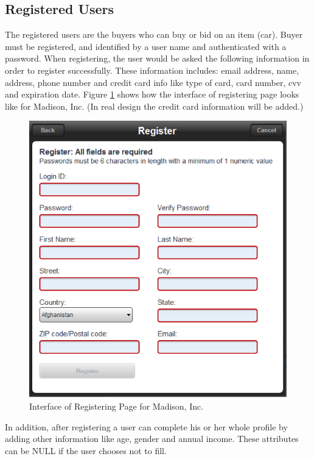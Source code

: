\documentclass[12pt]{article}
\begin{document}
\subsection{Registered Users}
The registered users are the buyers who can buy or bid on an item (car). Buyer must be registered, and identified by a user name and authenticated with a password. When registering, the user would be asked the following information in order to register successfully. These information includes: email address, name, address, phone number and credit card info like type of card, card number, cvv and expiration date. Figure \ref{registered_users} shows how the interface of registering page looks like for Madison, Inc. (In real design the credit card information will be added.)
\begin{figure}[!h]
\caption{Interface of Registering Page for Madison, Inc.} \label{registered_users}
\begin{center}
\includegraphics[width=13cm]{registered_users}
\end{center}
\end{figure}
\par In addition, after registering a user can complete his or her whole profile by adding other information like age, gender and annual income. These attributes can be NULL if the user chooses not to fill.\par
\end{document}
